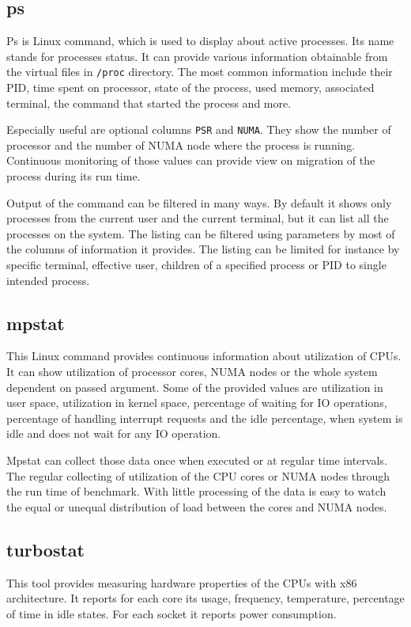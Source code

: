 \subsection{ps}
Ps is Linux command, which is used to display about active processes. Its name
stands for processes status. It can provide various information obtainable from
the virtual files in \texttt{/proc} directory. The most common information
include their PID, time spent on processor, state of the process, used memory,
associated terminal, the command that started the process and more.

Especially useful are optional columns \texttt{PSR} and \texttt{NUMA}. They
show the number of processor and the number of NUMA node where the process is
running. Continuous monitoring of those values can provide view on migration of
the process during its run time. 

Output of the command can be filtered in many ways. By default it shows only
processes from the current user and the current terminal, but it can list all
the processes on the system. The listing can be filtered using parameters by
most of the columns of information it provides. The listing can be limited for
instance by specific terminal, effective user, children of a specified process
or PID to single intended process.

\subsection{mpstat}
This Linux command provides continuous information about utilization of CPUs. It
can show utilization of processor cores, NUMA nodes or the whole system
dependent on passed argument. Some of the provided values are utilization in
user space, utilization in kernel space, percentage of waiting for IO
operations, percentage of handling interrupt requests and the idle percentage,
when system is idle and does not wait for any IO operation.

Mpstat can collect those data once when executed or at regular time intervals.
The regular collecting of utilization of the CPU cores or NUMA nodes through the
run time of benchmark. With little processing of the data is easy to watch the
equal or unequal distribution of load between the cores and NUMA nodes.

\subsection{turbostat}
This tool provides measuring hardware properties of the CPUs with x86
architecture. It reports for each core its usage, frequency, temperature,
percentage of time in idle states. For each socket it reports power consumption.


